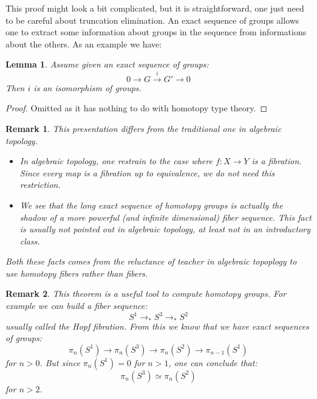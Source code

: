 \documentclass{article}
\renewcommand{\r}{\rightarrow}
\newtheorem{lemma}{Lemma}
\newtheorem{definition}{Definition}
\newtheorem{remark}{Remark}
\begin{document}
This proof might look a bit complicated, but it is straightforward, one just need to be careful about truncation elimination. An exact sequence of groups allows one to extract some information about groups in the sequence from informations about the others. As an example we have:

\begin{lemma}
Assume given an exact sequence of groups:
\[0 \r G \overset{i}{\r} G' \r 0\]
Then $i$ is an isomorphism of groups.
\end{lemma}
\begin{proof}
Omitted as it has nothing to do with homotopy type theory.
\end{proof}

\begin{remark}
This presentation differs from the traditional one in algebraic topology.
\begin{itemize}
\item In algebraic topology, one restrain to the case where $f:X\r Y$ is a fibration. Since every map is a fibration up to equivalence, we do not need this restriction.
\item We see that the long exact sequence of homotopy groups is actually the shadow of a more powerful (and infinite dimensional) fiber sequence. This fact is usually not pointed out in algebraic topology, at least not in an introductory class.
\end{itemize}
Both these facts comes from the reluctance of teacher in algebraic topoplogy to use homotopy fibers rather than fibers.
\end{remark}

\begin{remark}
This theorem is a useful tool to compute homotopy groups. For example we can build a fiber sequence: 
\[S^1\r_* S^3\r_*S^2\]
usually called the Hopf fibration. From this we know that we have exact sequences of groups:
\[\pi_n(S^1)\r \pi_n(S^3)\r \pi_n(S^2)\r \pi_{n-1}(S^1) \]
for $n> 0$. But since $\pi_n(S^1) = 0$ for $n>1$, one can conclude that:
\[\pi_n(S^3)\simeq \pi_n(S^2)\]
for $n>2$.
\end{remark}


\end{document}
